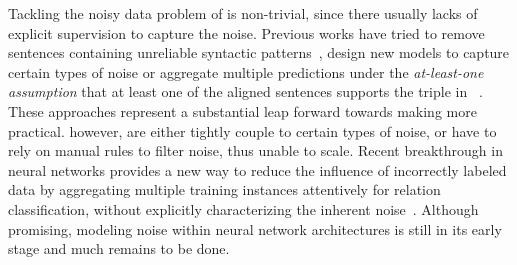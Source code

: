 Tackling the noisy data problem of \DS is non-trivial, since there usually lacks of explicit supervision to capture the noise.
Previous works have tried to remove sentences containing unreliable syntactic patterns~\cite{takamatsu2012reducing},
design new models to capture certain types of noise or aggregate multiple predictions under the
\textit{at-least-one assumption}
that at least one of the aligned sentences supports the triple in \KB~\cite{riedel2010modeling,surdeanu2012multi,ritter2013modeling,min2013distant}.
These approaches represent a substantial leap forward towards making \DS more practical. however,  are either tightly couple to certain types of noise,
or have to rely on manual rules to filter noise, thus unable to scale.
%
Recent breakthrough in neural networks provides a new way to reduce the influence of incorrectly labeled data by aggregating multiple training instances attentively for relation classification, without explicitly characterizing the inherent noise~\cite{lin2016neural,zeng2015distant}.
Although promising, %
 modeling noise within neural network architectures is still in its early stage and much remains to be done.


